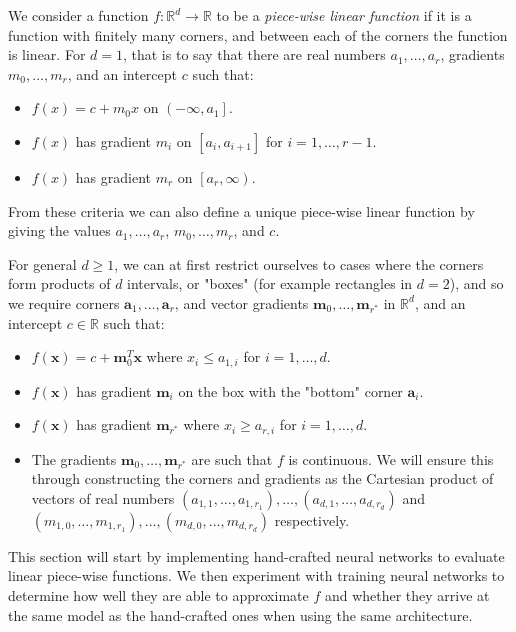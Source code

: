 \documentclass{somasmsc}
\begin{document}
We consider a function $f: \mathbb{R}^d \rightarrow \mathbb{R}$ to be a \textit{piece-wise linear function} if it is a function with finitely many corners, and between each of the corners the function is linear. For $d=1$, that is to say that there are real numbers $a_1, \dots, a_r$, gradients $m_0, \dots, m_r$, and an intercept $c$ such that:
\begin{itemize}
    \item $f(x) = c + m_0 x$ on $\left(-\infty, a_1\right]$.
    \item $f(x)$ has gradient $m_i$ on $\left[a_i, a_{i+1}\right]$ for $i=1, \dots, r-1$.
    \item $f(x)$ has gradient $m_r$ on $\left[a_r, \infty\right)$.
\end{itemize}
From these criteria we can also define a unique piece-wise linear function by giving the values $a_1, \dots, a_r$, $m_0, \dots, m_r$, and $c$.

For general $d \geq 1$, we can at first restrict ourselves to cases where the corners form products of $d$ intervals, or "boxes" (for example rectangles in $d=2$), and so we require corners $\pmb{a}_1, \dots, \pmb{a}_{r}$, and vector gradients $\pmb{m}_0, \dots, \pmb{m}_{r^*}$ in $\mathbb{R}^d$, and an intercept $c \in \mathbb{R}$ such that:
\begin{itemize}
    \item $f(\pmb{x}) = c + \pmb{m}_0^T \pmb{x}$ where $x_i \leq a_{1,i}$ for $i=1, \dots, d$.
    \item $f(\pmb{x})$ has gradient $\pmb{m}_i$ on the box with the "bottom" corner $\pmb{a}_i$.
    \item $f(\pmb{x})$ has gradient $\pmb{m}_{r^*}$ where $x_i \geq a_{r,i}$ for $i=1, \dots, d$.
    \item The gradients $\pmb{m}_0, \dots, \pmb{m}_{r^*}$ are such that $f$ is continuous. We will ensure this through constructing the corners and gradients as the Cartesian product of vectors of real numbers $\left(a_{1,1}, \dots, a_{1, r_1}\right), \dots, \left(a_{d, 1}, \dots, a_{d, r_d}\right)$ and $\left(m_{1,0}, \dots, m_{1, r_1}\right), \dots, \left(m_{d, 0}, \dots, m_{d, r_d}\right)$ respectively.
\end{itemize}

This section will start by implementing hand-crafted neural networks to evaluate linear piece-wise functions. We then experiment with training neural networks to determine how well they are able to approximate $f$ and whether they arrive at the same model as the hand-crafted ones when using the same architecture.
\end{document}
